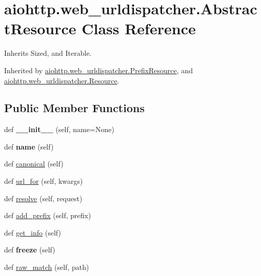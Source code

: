 \hypertarget{classaiohttp_1_1web__urldispatcher_1_1_abstract_resource}{}\section{aiohttp.\+web\+\_\+urldispatcher.\+Abstract\+Resource Class Reference}
\label{classaiohttp_1_1web__urldispatcher_1_1_abstract_resource}


Inherits Sized, and Iterable.



Inherited by \hyperlink{classaiohttp_1_1web__urldispatcher_1_1_prefix_resource}{aiohttp.\+web\+\_\+urldispatcher.\+Prefix\+Resource}, and \hyperlink{classaiohttp_1_1web__urldispatcher_1_1_resource}{aiohttp.\+web\+\_\+urldispatcher.\+Resource}.

\subsection*{Public Member Functions}
\begin{DoxyCompactItemize}
\item 
\mbox{\label{classaiohttp_1_1web__urldispatcher_1_1_abstract_resource_acdb14fad10b5b1f54cf29797f3fbf34a}} 
def {\bfseries \+\_\+\+\_\+init\+\_\+\+\_\+} (self, name=None)
\item 
\mbox{\label{classaiohttp_1_1web__urldispatcher_1_1_abstract_resource_ad1df8c03dc7b21daa238891701042517}} 
def {\bfseries name} (self)
\item 
def \hyperlink{classaiohttp_1_1web__urldispatcher_1_1_abstract_resource_ac5250f56b5b6aa8d852a7d1be58b1b65}{canonical} (self)
\item 
def \hyperlink{classaiohttp_1_1web__urldispatcher_1_1_abstract_resource_af9c5ec505dad7930839ce5fb9ccf9e20}{url\+\_\+for} (self, kwargs)
\item 
def \hyperlink{classaiohttp_1_1web__urldispatcher_1_1_abstract_resource_ad237aca506c6b674825d07edb46a50ea}{resolve} (self, request)
\item 
def \hyperlink{classaiohttp_1_1web__urldispatcher_1_1_abstract_resource_a96bb3932c53b2d48c6668afa9b88007e}{add\+\_\+prefix} (self, prefix)
\item 
def \hyperlink{classaiohttp_1_1web__urldispatcher_1_1_abstract_resource_a679465f0f9136fbbda8ae6f5d11ec72e}{get\+\_\+info} (self)
\item 
\mbox{\label{classaiohttp_1_1web__urldispatcher_1_1_abstract_resource_a252faf54debc9fd49975fb83263e9843}} 
def {\bfseries freeze} (self)
\item 
def \hyperlink{classaiohttp_1_1web__urldispatcher_1_1_abstract_resource_a7afb77d93e94f680451c49eb5900874f}{raw\+\_\+match} (self, path)
\end{DoxyCompactItemize}


